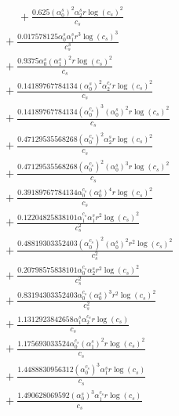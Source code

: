 \documentclass[10pt]{article}
\begin{document}
\begin{align*}
\phantom{R_{2,6}} &\phantom{={}}{}  + \frac{0.625 \left(\alpha_{0}^s\right)^{2} \alpha_{2}^s r \log{\left(c_{s} \right)}^{2}}{c_{s}} \\
&{}  + \frac{0.017578125 \alpha_{0}^s \alpha_{1}^s r^{3} \log{\left(c_{s} \right)}^{3}}{c_{s}^{3}} \\
&{}  + \frac{0.9375 \alpha_{0}^s \left(\alpha_{1}^s\right)^{2} r \log{\left(c_{s} \right)}^{2}}{c_{s}} \\
&{}  + \frac{0.14189767784134 \left(\alpha_{0}^s\right)^{2} \alpha_{2}^{c_s} r \log{\left(c_{s} \right)}^{2}}{c_{s}} \\
&{}  + \frac{0.14189767784134 \left(\alpha_{0}^{c_s}\right)^{3} \left(\alpha_{0}^s\right)^{2} r \log{\left(c_{s} \right)}^{2}}{c_{s}} \\
&{}  + \frac{0.47129535568268 \left(\alpha_{0}^{c_s}\right)^{2} \alpha_{2}^s r \log{\left(c_{s} \right)}^{2}}{c_{s}} \\
&{}  + \frac{0.47129535568268 \left(\alpha_{0}^{c_s}\right)^{2} \left(\alpha_{0}^s\right)^{3} r \log{\left(c_{s} \right)}^{2}}{c_{s}} \\
&{}  + \frac{0.39189767784134 \alpha_{0}^{c_s} \left(\alpha_{0}^s\right)^{4} r \log{\left(c_{s} \right)}^{2}}{c_{s}} \\
&{}  + \frac{0.12204825838101 \alpha_{1}^{c_s} \alpha_{1}^s r^{2} \log{\left(c_{s} \right)}^{2}}{c_{s}^{2}} \\
&{}  + \frac{0.48819303352403 \left(\alpha_{0}^{c_s}\right)^{2} \left(\alpha_{0}^s\right)^{2} r^{2} \log{\left(c_{s} \right)}^{2}}{c_{s}^{2}} \\
&{}  + \frac{0.20798575838101 \alpha_{0}^{c_s} \alpha_{2}^s r^{2} \log{\left(c_{s} \right)}^{2}}{c_{s}^{2}} \\
&{}  + \frac{0.83194303352403 \alpha_{0}^{c_s} \left(\alpha_{0}^s\right)^{3} r^{2} \log{\left(c_{s} \right)}^{2}}{c_{s}^{2}} \\
&{}  + \frac{1.1312923842658 \alpha_{1}^s \alpha_{2}^{c_s} r \log{\left(c_{s} \right)}}{c_{s}} \\
&{}  + \frac{1.175693033524 \alpha_{0}^{c_s} \left(\alpha_{1}^s\right)^{2} r \log{\left(c_{s} \right)}^{2}}{c_{s}} \\
&{}  + \frac{1.4488830956312 \left(\alpha_{0}^{c_s}\right)^{3} \alpha_{1}^s r \log{\left(c_{s} \right)}}{c_{s}} \\
&{}  + \frac{1.490628069592 \left(\alpha_{0}^s\right)^{3} \alpha_{1}^{c_s} r \log{\left(c_{s} \right)}}{c_{s}} \\

\end{align*}
\end{document}
